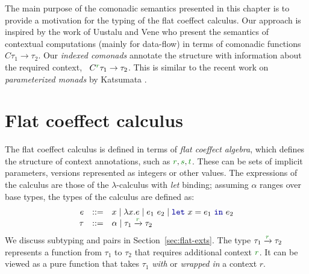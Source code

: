 The main purpose of the comonadic semantics presented in this chapter is to provide a motivation 
for the typing of the flat coeffect calculus. Our approach is inspired by the work of Uustalu and
Vene \cite{comonads-notions} who present the semantics of contextual computations (mainly for
data-flow) in terms of comonadic functions $C \tau_1 \rightarrow \tau_2$. Our \emph{indexed 
comonads} annotate the structure with information about the required context, \ie~$C^{\cclrd{r}} \tau_1 \rightarrow \tau_2$.
This is similar to the recent work on \emph{parameterized monads} by Katsumata \cite{monads-parametric}.




%                                                            
%                                                           

\section{Flat coeffect calculus}
\label{sec:flat-calculus}

The flat coeffect calculus is defined in terms of \emph{flat coeffect algebra}, which defines
the structure of context annotations, such as $\cclrd{r}, \cclrd{s}, \cclrd{t}$. These can be
sets of implicit parameters, versions represented as integers or other values. The expressions of 
the calculus are those of the $\lambda$-calculus with \emph{let} binding; assuming $\alpha$ ranges 
over base types, the types of the calculus are defined as:
%
\begin{equation*}
\begin{array}{rcl}
e &::=& x \sep \lambda x.e \sep e_1~e_2 \sep \kvd{let}~x = e_1~\kvd{in}~e_2\\
\tau &::=& \alpha \sep \tau_1 \xrightarrow{\cclrd{r}} \tau_2
\end{array}
\end{equation*}
%
We discuss subtyping and pairs in Section~\ref{sec:flat-exts}. The type $\tau_1 \xrightarrow{\cclrd{r}} \tau_2$
represents a function from $\tau_1$ to $\tau_2$ that requires additional context $\cclrd{r}$.
It can be viewed as a pure function that takes $\tau_1$ \emph{with} or \emph{wrapped in} a 
context $r$. 

